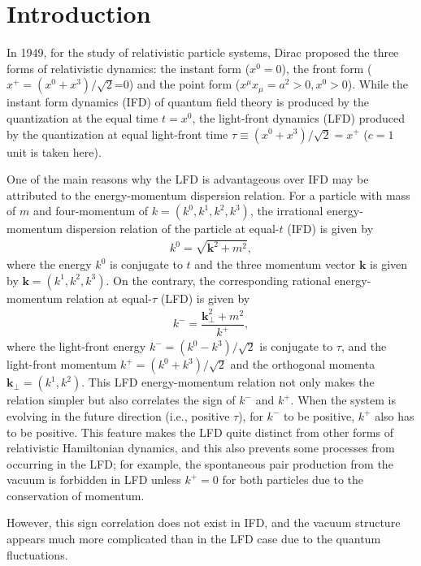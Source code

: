 \documentclass[journal,article,submit,pdftex,moreauthors]{Definitions/mdpi}
\begin{document}
\section{Introduction}
\label{sec:introduction}

In 1949, for the study of relativistic particle systems, Dirac \cite{Dirac1949} proposed the three forms of relativistic dynamics: the instant form ($x^{0}=0$), the front form ($x^{+}=(x^{0}+x^{3})/\sqrt{2}$=0) and the point form ($x^{\mu}x_{\mu}=a^{2}>0, x^{0}>0$).
While the instant form dynamics (IFD) of quantum field theory is produced by the quantization at the equal time $t=x^{0}$, the light-front dynamics (LFD) produced by the quantization at equal light-front time $\tau \equiv (x^{0}+x^{3})/\sqrt{2}=x^{+}$ ($c=1$ unit is taken here).

One of the main reasons why the LFD is advantageous over IFD may be attributed to the energy-momentum dispersion relation. For a particle with mass of $m$ and four-momentum of $k=(k^{0},k^{1},k^{2},k^{3})$, the irrational energy-momentum dispersion relation of the particle at equal-$t$ (IFD) is given by
\begin{align}
  k^{0}=\sqrt{\mathbf{k}^{2}+m^{2}}, \label{eqn:E-P_relation_IF}
\end{align}
where the energy $k^{0}$ is conjugate to $t$ and the three momentum vector $\mathbf{k}$ is given by $\mathbf{k}=(k^{1},k^{2},k^{3})$.
On the contrary, the corresponding rational energy-momentum relation at equal-$\tau$ (LFD) is given by
\begin{align}
  k^{-}=\dfrac{\mathbf{k}_{\perp}^{2}+m^{2}}{k^{+}}, \label{eqn:E-P_relation_LF}
\end{align}
where the light-front energy $k^{-}=(k^{0}-k^{3})/\sqrt{2}$ is conjugate to $\tau$, and the light-front momentum $k^{+}=(k^{0}+k^{3})/\sqrt{2}$ and the orthogonal momenta $\mathbf{k}_{\perp}=(k^{1},k^{2})$. This LFD energy-momentum relation not only makes the relation simpler but also correlates the sign of $k^{-}$ and $k^{+}$.
When the system is evolving in the future direction (i.e., positive $\tau$), for $k^{-}$ to be positive, $k^{+}$ also has to be positive. This feature makes the LFD quite distinct from other forms of relativistic Hamiltonian dynamics, and this also prevents some processes from occurring in the LFD; for example, the spontaneous pair production from the vacuum is forbidden in LFD unless $k^{+}=0$ for both particles due to the conservation of momentum.

However, this sign correlation does not exist in IFD, and the vacuum structure appears much more complicated than in the LFD case due to the quantum fluctuations. 
\end{document}
